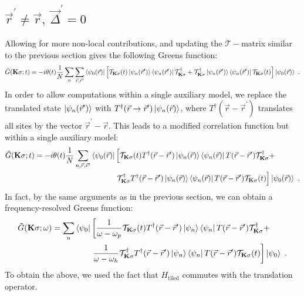 \documentclass[reprint,hidelinks,onecolumn]{revtex4-2}
\begin{document}
\subsection{\(\vec r^\prime \neq \vec r,~\vec\Delta^\prime=0\)}
Allowing for more non-local contributions, and updating the \(\mathcal{T}-\)matrix similar to the previous section gives the following Greens function:
\begin{equation}\begin{aligned}
	\tilde G({\bf K}\sigma; t) = -i\theta(t)\frac{1}{N}\sum_n\sum_{\vec r, \vec r^\prime} \braket{\psi_{0}(\vec r) | \left[\mathcal{T}_{{\bf K}\sigma}(t) \ket{\psi_n(\vec r^\prime)}\bra{\psi_n(\vec r^\prime)} \mathcal{T}_{{\bf K}\sigma}^\dagger + \mathcal{T}^\dagger_{{\bf K}\sigma} \ket{\psi_n(\vec r^\prime)}\bra{\psi_n(\vec r^\prime)} \mathcal{T}_{{\bf K}\sigma}(t)\right] | \psi_{0}(\vec r)} ~.
\end{aligned}\end{equation}
In order to allow computations within a single auxiliary model, we replace the translated state \(\ket{\psi_n(\vec r^\prime)}\) with \(T^\dagger(\vec r \to \vec r^\prime)\ket{\psi_n(\vec r)} \), where \(T^\dagger(\vec r - \vec r^\prime)\) translates all sites by the vector \(\vec r^\prime - \vec r\). This leads to a modified correlation function but within a single auxiliary model:
\begin{equation}\begin{aligned}
	\tilde G({\bf K}\sigma; t) = -i\theta(t)\frac{1}{N}\sum_{n,\vec r, \vec r^\prime} \bra{\psi_{0}(\vec r)} &\left[\mathcal{T}_{{\bf K}\sigma}(t)T^\dagger(\vec r - \vec r^\prime) \ket{\psi_n(\vec r)}\bra{\psi_n(\vec r)}T(\vec r - \vec r^\prime) \mathcal{T}_{{\bf K}\sigma}^\dagger + \right. \\
								&\left. \mathcal{T}^\dagger_{{\bf K}\sigma}T^\dagger(\vec r - \vec r^\prime) \ket{\psi_n(\vec r)}\bra{\psi_n(\vec r)}T(\vec r - \vec r^\prime) \mathcal{T}_{{\bf K}\sigma}(t)\right] \ket{\psi_{0}(\vec r)} ~.
\end{aligned}\end{equation}
In fact, by the same arguments as in the previous section, we can obtain a frequency-resolved Greens function:
\begin{equation}\begin{aligned}
	\tilde G({\bf K}\sigma; \omega) = \sum_n \bra{\psi_{0}} &\left[\frac{1}{\omega - \omega_p} \mathcal{T}_{{\bf K}\sigma}(t)T^\dagger(\vec r - \vec r^\prime) \ket{\psi_n}\bra{\psi_n}T(\vec r - \vec r^\prime) \mathcal{T}_{{\bf K}\sigma}^\dagger + \right.\\
															&\left. \frac{1}{\omega - \omega_h} \mathcal{T}^\dagger_{{\bf K}\sigma}T^\dagger(\vec r - \vec r^\prime) \ket{\psi_n}\bra{\psi_n}T(\vec r - \vec r^\prime) \mathcal{T}_{{\bf K}\sigma}(t)\right] \ket{\psi_{0}} ~.
\end{aligned}\end{equation}
To obtain the above, we used the fact that \(H_\text{tiled}\) commutes with the translation operator.
\end{document}
